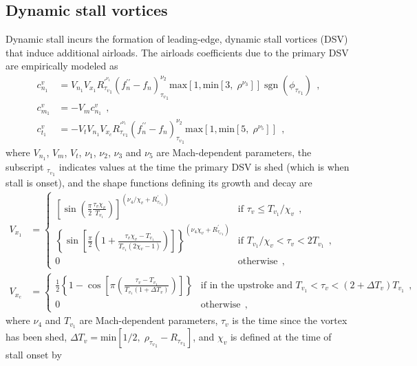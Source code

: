 \documentclass[12pt,a4paper,oneside,english]{abntex2} %
\DeclareMathOperator{\sgn}{sgn}
\def\lb{\left[}
\def\rb{\right]}
\def\lp{\left(}
\def\rp{\right)}
\begin{document}
\subsection{Dynamic stall vortices}

Dynamic stall incurs the formation of leading-edge, dynamic stall vortices (DSV) that induce additional airloads. The airloads coefficients due to the primary DSV are empirically modeled as
\begin{align}
    c_{n_1}^v &= V_{n_1} V_{x_1} R^{\prime^{\nu_1}}_{{\tau_v}_1} \lp f_n^{\prime\prime}-f_n\rp_{{\tau_v}_1}^{\nu_2} \text{max}\lb1,\text{min}\lb3,\;\rho^{\nu_3}\rb\rb \sgn\lp\phi_{{\tau_v}_1}\rp \ \ ,
    \label{eq:cnv1} 
    \\
    c_{m_1}^v &= -V_m c_{n_1}^v \ \ ,
    \label{eq:cmv1}
    \\
    c_{t_1}^v &= -V_t V_{n_1} V_{x_c} R^{\prime^{\nu_1}}_{{\tau_v}_1} \lp f_n^{\prime\prime}-f_n\rp_{{\tau_v}_1}^{\nu_2} \text{max}\lb1,\text{min}\lb5,\;\rho^{\nu_5}\rb\rb \ \ ,
    \label{eq:ctv1}
\end{align}
where $V_{n_1}$, $V_m$, $V_t$, $\nu_1$, $\nu_2$, $\nu_3$ and $\nu_5$ are Mach-dependent parameters, the subscript $_{{\tau_v}_1}$ indicates values at the time the primary DSV is shed (which is when stall is onset), and the shape functions defining its growth and decay are
\begin{align}
    V_{x_1} &= 
    \begin{cases}
    {\lb\sin{\lp\frac{\pi}{2}\frac{\tau_v\chi_v}{T_{v_1}}\rp}\rb}^{\lp\nu_4/\chi_v+R^{\prime}_{{\tau_v}_1}\rp} 
    &\text{if } \tau_{v} \leq T_{v_1}/\chi_v \ \ ,
    \\ 
    {\left\{\sin{\lb\frac{\pi}{2}\lp1+\frac{\tau_v\chi_v-T_{v_1}}{T_{v_1}(2\chi_v-1)}\rp\rb}\right\}}^{\lp\nu_4\chi_v+R^{\prime}_{{\tau_v}_1}\rp} 
    &\text{if } T_{v_1}/\chi_v < \tau_{v} < 2T_{v_1} \ \ ,
    \\ 
    0  &\text{otherwise} \ \ ,
    \end{cases}
    \label{eq:Vx1}
    \\
    V_{x_c} &=
    \begin{cases}
    \frac{1}{2}\left\{1-\cos{\lb\pi\lp\frac{\tau_v-T_{v_1}}{T_{v_1} \lp1+\Delta T_v \rp}\rp\rb}\right\} &\text{if in the upstroke and } T_{v_1} < \tau_v < \lp2+\Delta T_v\rp T_{v_1} \ \ ,
    \\
    0 &\text{otherwise} \ \ ,
    \end{cases}
    \label{eq:Vxc}
\end{align}
where $\nu_4$ and $T_{v_1}$ are Mach-dependent parameters, $\tau_{v}$ is the time since  the vortex has been shed, $\Delta T_v=\text{min}\lb1/2,\;\rho_{{\tau_v}_1}-R_{{\tau_v}_1}\rb$, and $\chi_v$ is defined at the time of stall onset by
\end{document}
